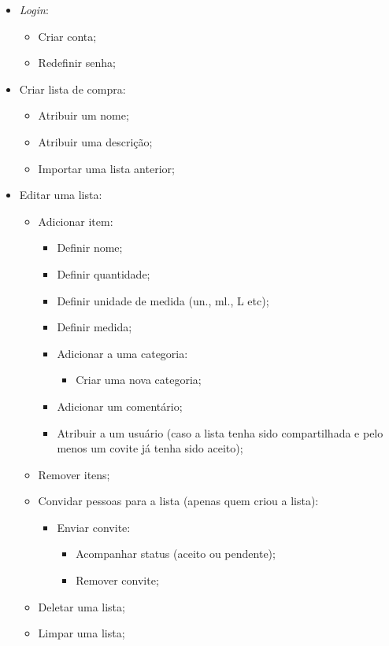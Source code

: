 \begin{itemize}
	\item \textit{Login}:
		\begin{itemize}
			\item Criar conta;
			\item Redefinir senha;
		\end{itemize}
	\item Criar lista de compra:
		\begin{itemize}
			\item Atribuir um nome;
			\item Atribuir uma descrição;
			\item Importar uma lista anterior;
		\end{itemize}
	\item Editar uma lista:
		\begin{itemize}
			\item Adicionar item:
				\begin{itemize}
					\item Definir nome;
					\item Definir quantidade;
					\item Definir unidade de medida (un., ml., L etc);
					\item Definir medida;
					\item Adicionar a uma categoria:
						\begin{itemize}
							\item Criar uma nova categoria;
						\end{itemize}
					\item Adicionar um comentário;
					\item Atribuir a um usuário (caso a lista tenha sido compartilhada e pelo menos um covite já tenha sido aceito);
				\end{itemize}
			\item Remover itens;
			\item Convidar pessoas para a lista (apenas quem criou a lista):
				\begin{itemize}
					\item Enviar convite:
						\begin{itemize}
							\item Acompanhar  status (aceito ou pendente);
							\item Remover convite;
						\end{itemize}
				\end{itemize}
			\item Deletar uma lista;
			\item Limpar uma lista;

\end{itemize}
\end{itemize}
